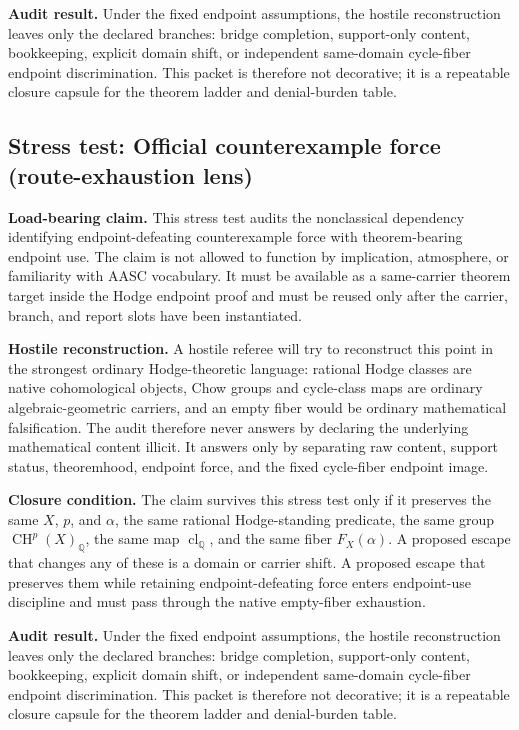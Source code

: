 \documentclass[11pt]{article}
\newcommand{\QQ}{\mathbb{Q}}
\newcommand{\CH}{\operatorname{CH}}
\newcommand{\clQ}{\operatorname{cl}_{\QQ}}
\begin{document}
\par\noindent\textbf{Audit result.} Under the fixed endpoint assumptions, the hostile reconstruction leaves only the declared branches: bridge completion, support-only content, bookkeeping, explicit domain shift, or independent same-domain cycle-fiber endpoint discrimination. This packet is therefore not decorative; it is a repeatable closure capsule for the theorem ladder and denial-burden table.


\subsection{Stress test: Official counterexample force (route-exhaustion lens)}

\par\noindent\textbf{Load-bearing claim.} This stress test audits the nonclassical dependency identifying endpoint-defeating counterexample force with theorem-bearing endpoint use. The claim is not allowed to function by implication, atmosphere, or familiarity with AASC vocabulary. It must be available as a same-carrier theorem target inside the Hodge endpoint proof and must be reused only after the carrier, branch, and report slots have been instantiated.

\par\noindent\textbf{Hostile reconstruction.} A hostile referee will try to reconstruct this point in the strongest ordinary Hodge-theoretic language: rational Hodge classes are native cohomological objects, Chow groups and cycle-class maps are ordinary algebraic-geometric carriers, and an empty fiber would be ordinary mathematical falsification. The audit therefore never answers by declaring the underlying mathematical content illicit. It answers only by separating raw content, support status, theoremhood, endpoint force, and the fixed cycle-fiber endpoint image.

\par\noindent\textbf{Closure condition.} The claim survives this stress test only if it preserves the same $X$, $p$, and $\alpha$, the same rational Hodge-standing predicate, the same group $\CH^p(X)_\QQ$, the same map $\clQ$, and the same fiber $F_X(\alpha)$. A proposed escape that changes any of these is a domain or carrier shift. A proposed escape that preserves them while retaining endpoint-defeating force enters endpoint-use discipline and must pass through the native empty-fiber exhaustion.

\par\noindent\textbf{Audit result.} Under the fixed endpoint assumptions, the hostile reconstruction leaves only the declared branches: bridge completion, support-only content, bookkeeping, explicit domain shift, or independent same-domain cycle-fiber endpoint discrimination. This packet is therefore not decorative; it is a repeatable closure capsule for the theorem ladder and denial-burden table.
\end{document}

